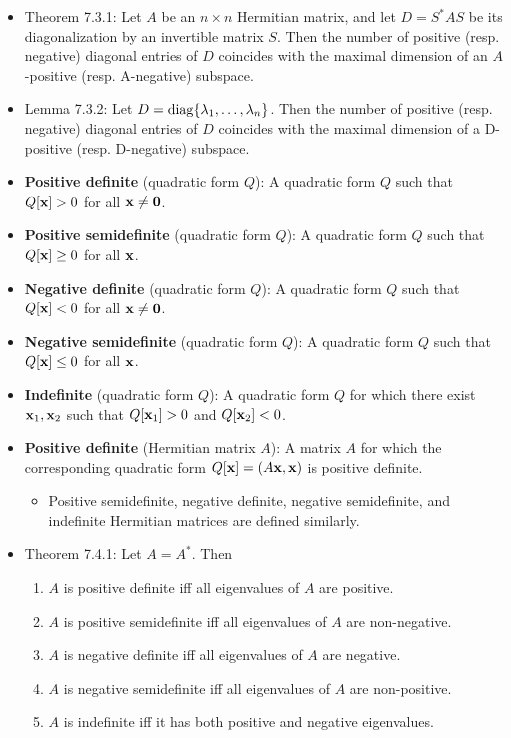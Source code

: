 \documentclass[../../notes.tex]{subfiles}
\begin{document}
\begin{itemize}
    \item Theorem 7.3.1: Let $A$ be an $n\times n$ Hermitian matrix, and let $D=S^*AS$ be its diagonalization by an invertible matrix $S$. Then the number of positive (resp. negative) diagonal entries of $D$ coincides with the maximal dimension of an $A$-positive (resp. A-negative) subspace.
    \item Lemma 7.3.2: Let $D=\operatorname{diag}\{\lambda_1,\dots,\lambda_n\}$. Then the number of positive (resp. negative) diagonal entries of $D$ coincides with the maximal dimension of a D-positive (resp. D-negative) subspace.
    \item \textbf{Positive definite} (quadratic form $Q$): A quadratic form $Q$ such that $Q[\mathbf{x}]>0$ for all $\mathbf{x}\neq\bm{0}$.
    \item \textbf{Positive semidefinite} (quadratic form $Q$): A quadratic form $Q$ such that $Q[\mathbf{x}]\geq 0$ for all $\mathbf{x}$.
    \item \textbf{Negative definite} (quadratic form $Q$): A quadratic form $Q$ such that $Q[\mathbf{x}]<0$ for all $\mathbf{x}\neq\bm{0}$.
    \item \textbf{Negative semidefinite} (quadratic form $Q$): A quadratic form $Q$ such that $Q[\mathbf{x}]\leq 0$ for all $\mathbf{x}$.
    \item \textbf{Indefinite} (quadratic form $Q$): A quadratic form $Q$ for which there exist $\mathbf{x}_1,\mathbf{x}_2$ such that $Q[\mathbf{x}_1]>0$ and $Q[\mathbf{x}_2]<0$.
    \item \textbf{Positive definite} (Hermitian matrix $A$): A matrix $A$ for which the corresponding quadratic form $Q[\mathbf{x}]=(A\mathbf{x},\mathbf{x})$ is positive definite.
    \begin{itemize}
        \item Positive semidefinite, negative definite, negative semidefinite, and indefinite Hermitian matrices are defined similarly.
    \end{itemize}
    \item Theorem 7.4.1: Let $A=A^*$. Then
    \begin{enumerate}
        \item $A$ is positive definite iff all eigenvalues of $A$ are positive.
        \item $A$ is positive semidefinite iff all eigenvalues of $A$ are non-negative.
        \item $A$ is negative definite iff all eigenvalues of $A$ are negative.
        \item $A$ is negative semidefinite iff all eigenvalues of $A$ are non-positive.
        \item $A$ is indefinite iff it has both positive and negative eigenvalues.

\end{enumerate}
\end{itemize}
\end{document}
